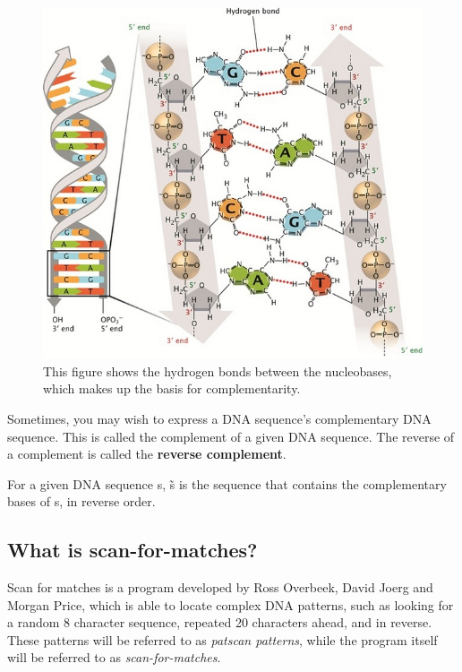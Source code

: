 \documentclass[12pt]{article}
\theoremstyle{definition}
\begin{document}
\begin{figure}[H]
	\label{Complementarity}
	\begin{center}
		\includegraphics[scale=2.5]{complementarity.jpg}	
	\end{center}
	\caption{This figure shows the hydrogen bonds between the nucleobases, which makes up the basis for complementarity.\cite{DNA-nature}}
\end{figure}

Sometimes, you may wish to express a DNA sequence's complementary DNA sequence. This is called the complement of a given DNA sequence. The reverse of a complement is called the \textbf{reverse complement}.

\begin{definition}
For a given DNA sequence s, \~{s} is the sequence that contains the complementary bases of s, in reverse order.
\end{definition}

\subsection{What is scan-for-matches?}

Scan for matches is a program developed by Ross Overbeek, David Joerg and Morgan Price\cite{scan-for-matches}, which is able to locate complex DNA patterns, such as looking for a random 8 character sequence, repeated 20 characters ahead, and in reverse. These patterns will be referred to as \textit{patscan patterns}, while the program itself will be referred to as \textit{scan-for-matches}.
\end{document}

